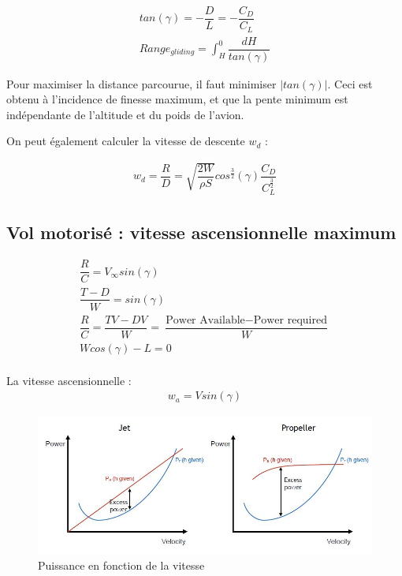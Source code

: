 \documentclass{report}
\begin{document}
\begin{eqnarray}
tan(\gamma) = -\dfrac{D}{L}=-\dfrac{C_D}{C_L}\\
Range_{gliding}=\int_H^0\dfrac{dH}{tan(\gamma)}
\end{eqnarray}

Pour maximiser la distance parcourue, il faut minimiser $|tan(\gamma)|$. Ceci est obtenu à l'incidence de finesse maximum, et que la pente minimum est indépendante de l'altitude et du poids de l'avion.

On peut également calculer la vitesse de descente $w_d$ :

\begin{eqnarray}
w_d=\dfrac{R}{D}=\sqrt{\dfrac{2W}{\rho S}}cos^{\frac{3}{2}}(\gamma)\dfrac{C_D}{C_L^{\frac{3}{2}}}
\end{eqnarray}

\subsection{Vol motorisé : vitesse ascensionnelle maximum}

\begin{eqnarray}
\dfrac{R}{C}=V_\infty sin(\gamma)\\
\dfrac{T-D}{W}=sin(\gamma)\\
\dfrac{R}{C}=\dfrac{TV-DV}{W}=\dfrac{\text{Power Available}-\text{Power required}}{W}\\
W cos(\gamma)-L=0\\
\end{eqnarray}

La vitesse ascensionnelle :
\begin{eqnarray}
w_a=V sin(\gamma)
\end{eqnarray}

\begin{figure}[h!]
    \centering
    \includegraphics[scale=0.7]{13.JPG}
    \caption{Puissance en fonction de la vitesse}
    \label{13}
\end{figure}
\end{document}
